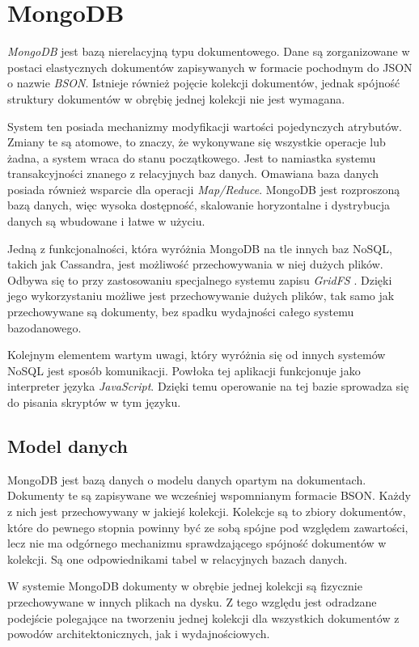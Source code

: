 \section{MongoDB}

\textit{MongoDB} jest bazą nierelacyjną typu dokumentowego.
Dane są zorganizowane w postaci elastycznych dokumentów zapisywanych w formacie pochodnym do JSON o nazwie \textit{BSON}.
Istnieje również pojęcie kolekcji dokumentów, jednak spójność struktury dokumentów w obrębię jednej kolekcji nie jest wymagana.

System ten posiada mechanizmy modyfikacji wartości pojedynczych atrybutów.
Zmiany te są atomowe, to znaczy, że wykonywane się wszystkie operacje lub żadna, a system wraca do stanu początkowego.
Jest to namiastka systemu transakcyjności znanego z relacyjnych baz danych.
Omawiana baza danych posiada również wsparcie dla operacji \textit{Map/Reduce}. 
MongoDB jest rozproszoną bazą danych, więc wysoka dostępność, skalowanie horyzontalne i dystrybucja danych są wbudowane i łatwe w użyciu.

Jedną z funkcjonalności, która wyróżnia MongoDB na tle innych baz NoSQL, takich jak Cassandra, jest możliwość przechowywania w niej dużych plików.
Odbywa się to przy zastosowaniu specjalnego systemu zapisu \textit{GridFS} \cite{GridFSManual}.
Dzięki jego wykorzystaniu możliwe jest przechowywanie dużych plików, tak samo jak przechowywane są dokumenty, bez spadku wydajności całego systemu bazodanowego.

Kolejnym elementem wartym uwagi, który wyróżnia się od innych systemów NoSQL jest sposób komunikacji.
Powłoka tej aplikacji funkcjonuje jako interpreter języka \textit{JavaScript}.
Dzięki temu operowanie na tej bazie sprowadza się do pisania skryptów w tym języku.

\subsection{Model danych}

MongoDB jest bazą danych o modelu danych opartym na dokumentach.
Dokumenty te są zapisywane we wcześniej wspomnianym formacie BSON.
Każdy z nich jest przechowywany w jakiejś kolekcji.
Kolekcje są to zbiory dokumentów, które do pewnego stopnia powinny być ze sobą spójne pod względem zawartości, lecz nie ma odgórnego mechanizmu sprawdzającego spójność dokumentów w kolekcji.
Są one odpowiednikami tabel w relacyjnych bazach danych.

W systemie MongoDB dokumenty w obrębie jednej kolekcji są fizycznie przechowywane w innych plikach na dysku.
Z tego względu jest odradzane podejście polegające na tworzeniu jednej kolekcji dla wszystkich dokumentów z powodów architektonicznych, jak i wydajnościowych.

